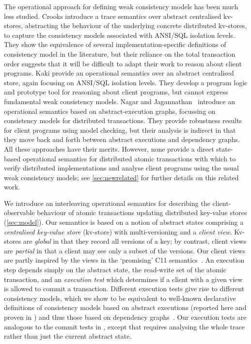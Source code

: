 The operational approach for defining weak consistency models has been
much less studied.  Crooks \etal\citet{seebelieve} introduce
a trace semantics over  abstract centralised
kv-stores,  abstracting the behaviour of the underlying concrete distributed 
kv-stores,   to 
capture the  consistency models associated with ANSI/SQL isolation
levels. 
They show the equivalence of several
implementation-specific definitions of consistency model in the
literature, but their reliance on the total transaction order 
suggests that it will be difficult to adapt their work to reason about
client programs. Kaki \etal\citet{alonetogether} provide an
operational semantics over an abstract centralised store, again
focusing on ANSI/SQL isolation levels. They develop a program logic
and prototype tool for reasoning about client programs, but cannot
express fundamental weak consistency models. 
Nagar and Jagannathan~\cite{sureshConcur} introduce an operational semantics based on
abstract-execution graphs, focussing on consistency models for
distributed transactions. They provide robustness results for client
programs using model checking, but their analysis is indirect in that
they move back and forth between abstract executions and dependency
graphs. All these approaches have their merits. However, none 
provide a direct state-based operational semantics for distributed
atomic transactions with which to verify distributed implementations
and analyse client programs using the usual weak consistency models; 
see \cref{sec:newrelated} for further details on this related work. 



We introduce an interleaving operational semantics for describing the
client-observable behaviour of atomic transactions 
updating distributed key-value stores  (\cref{sec:model}). Our semantics is
based on a notion of abstract states comprising a \emph{centralised key-value store} (kv-store) with {multi-versioning} and a \emph{client view}.
Kv-stores are {\em global} in that they record all versions of a key; 
by contrast, client views are {\em partial} in that a client may see only a subset of the versions. 
Our client views are partly inspired by the views in the `promising' C11 semantics~\cite{promises}. 
An execution step depends simply on the abstract state, the read-write set of the atomic transaction, and an \emph{execution test} which
determines if a client with a given view is allowed to commit a transaction. Different execution tests give rise to different
consistency models, 
which we show to be equivalent to well-known
declarative definitions of consistency models based on abstract executions 
(reported here and proven in \cite{shale-phd}) and thus those based on dependency graphs~\cite{laws}. 
Our execution tests are analogous to the commit tests in \cite{seebelieve},
except that \cite{seebelieve} requires analysing the whole trace rather than just the current abstract state. 

